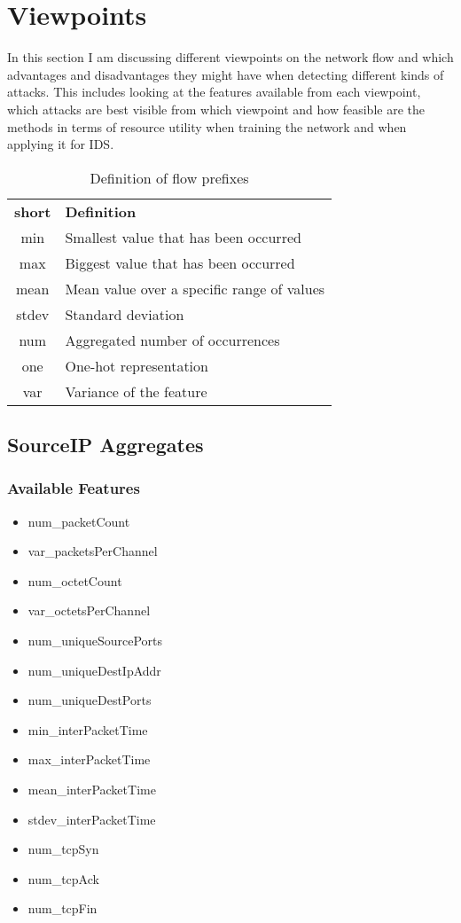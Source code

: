 \documentclass[11pt]{article}
\begin{document}
\pagebreak
\section{Viewpoints}

In this section I am discussing different viewpoints on the network flow and which advantages and disadvantages they might have when detecting different kinds of attacks. This includes looking at the features available from each viewpoint, which attacks are best visible from which viewpoint and how feasible are the methods in
terms of resource utility when training the network and when applying it for IDS.

\begin{table}[h]
	\begin{tabular}{c | l}
		\textbf{short} & \textbf{Definition} \\
		min & Smallest value that has been occurred \\
		max & Biggest value that has been occurred \\
		mean & Mean value over a specific range of values \\
		stdev &	Standard deviation \\
		num & Aggregated number of occurrences \\
		one & One-hot representation \\
		var & Variance of the feature
	\end{tabular}
	\caption{\label{tab:flow_prefixes} Definition of flow prefixes}
\end{table}

\subsection{SourceIP Aggregates}
\subsubsection{Available Features}

\begin{itemize}
	\itemsep0em
	\item num\_packetCount
	\item var\_packetsPerChannel
	\item num\_octetCount
	\item var\_octetsPerChannel
	\item num\_uniqueSourcePorts
	\item num\_uniqueDestIpAddr
	\item num\_uniqueDestPorts
	\item min\_interPacketTime
	\item max\_interPacketTime
	\item mean\_interPacketTime
	\item stdev\_interPacketTime
	\item num\_tcpSyn
	\item num\_tcpAck
	\item num\_tcpFin
\end{itemize}
\end{document}
